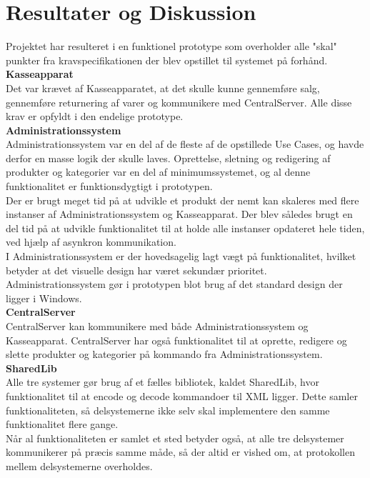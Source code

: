 \section{Resultater og Diskussion}
Projektet har resulteret i en funktionel prototype som overholder alle "skal" punkter fra kravspecifikationen der blev opstillet til systemet på forhånd.\\

\textbf{Kasseapparat}\\
Det var krævet af Kasseapparatet, at det skulle kunne gennemføre salg, gennemføre returnering af varer og kommunikere med CentralServer. Alle disse krav er opfyldt i den endelige prototype.\\

\textbf{Administrationssystem}\\
Administrationssystem var en del af de fleste af de opstillede Use Cases, og havde derfor en masse logik der skulle laves. Oprettelse, sletning og redigering af produkter og kategorier var en del af minimumssystemet, og al denne funktionalitet er funktionsdygtigt i prototypen.\\
Der er brugt meget tid på at udvikle et produkt der nemt kan skaleres med flere instanser af Administrationssystem og Kasseapparat. Der blev således brugt en del tid på at udvikle funktionalitet til at holde alle instanser opdateret hele tiden, ved hjælp af asynkron kommunikation.\\
I Administrationssystem er der hovedsagelig lagt vægt på funktionalitet, hvilket betyder at det visuelle design har været sekundær prioritet. Administrationssystem gør i prototypen blot brug af det standard design der ligger i Windows.\\

\textbf{CentralServer}\\
CentralServer kan kommunikere med både Administrationssystem og Kasseapparat. CentralServer har også funktionalitet til at oprette, redigere og slette produkter og kategorier på kommando fra Administrationssystem.\\

\textbf{SharedLib}\\
Alle tre systemer gør brug af et fælles bibliotek, kaldet SharedLib, hvor funktionalitet til at encode og decode kommandoer til XML ligger. Dette samler funktionaliteten, så delsystemerne ikke selv skal implementere den samme funktionalitet flere gange.\\
Når al funktionaliteten er samlet et sted betyder også, at alle tre delsystemer kommunikerer på præcis samme måde, så der altid er vished om, at protokollen mellem delsystemerne overholdes.\\